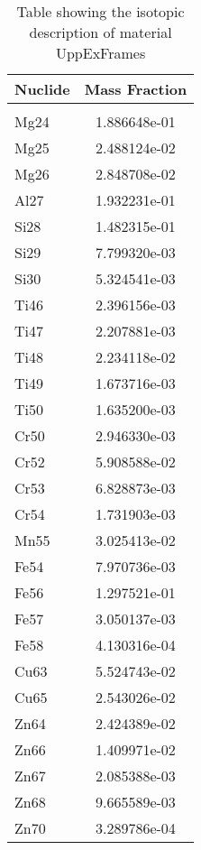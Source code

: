 \begin{centering}
\begin{table}[ht!]
\begin{tabular}{l | c}
\hline
Nuclide & Mass Fraction\\
\hline
\\
Mg24 & 1.886648e-01\\
Mg25 & 2.488124e-02\\
Mg26 & 2.848708e-02\\
Al27 & 1.932231e-01\\
Si28 & 1.482315e-01\\
Si29 & 7.799320e-03\\
Si30 & 5.324541e-03\\
Ti46 & 2.396156e-03\\
Ti47 & 2.207881e-03\\
Ti48 & 2.234118e-02\\
Ti49 & 1.673716e-03\\
Ti50 & 1.635200e-03\\
Cr50 & 2.946330e-03\\
Cr52 & 5.908588e-02\\
Cr53 & 6.828873e-03\\
Cr54 & 1.731903e-03\\
Mn55 & 3.025413e-02\\
Fe54 & 7.970736e-03\\
Fe56 & 1.297521e-01\\
Fe57 & 3.050137e-03\\
Fe58 & 4.130316e-04\\
Cu63 & 5.524743e-02\\
Cu65 & 2.543026e-02\\
Zn64 & 2.424389e-02\\
Zn66 & 1.409971e-02\\
Zn67 & 2.085388e-03\\
Zn68 & 9.665589e-03\\
Zn70 & 3.289786e-04
\end{tabular}
\caption{Table showing the isotopic description of material UppExFrames}
\label{table:material_UppExFrames}
\end{table}\clearpage


\end{centering}
